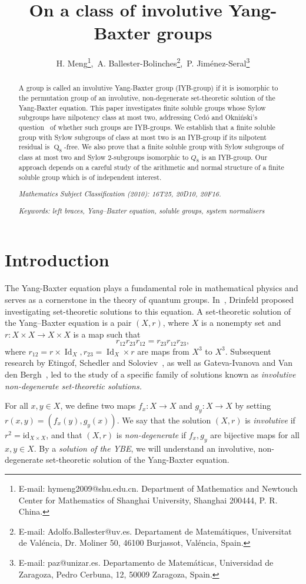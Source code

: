 \documentclass[12pt,a4paper]{article}
\title{On a class of involutive Yang-Baxter groups}
\author{H. Meng\thanks{E-mail: hymeng2009@shu.edu.cn. Department of Mathematics
and Newtouch Center for Mathematics of Shanghai University,
Shanghai 200444, P. R. China. },~A. Ballester-Bolinches\thanks{E-mail: Adolfo.Ballester@uv.es. Departament de Matem\'{a}tiques, Universitat de Val\'{e}ncia, Dr. Moliner 50, 46100 Burjassot, Val\'{e}ncia,
Spain.},~P. Jim\'{e}nez-Seral\thanks{E-mail: paz@unizar.es. Departamento de Matem\'{a}ticas, Universidad de Zaragoza, Pedro Cerbuna, 12, 50009 Zaragoza, Spain.}
}
\date{}
\DeclareMathOperator{\Id}{Id}
\DeclareMathOperator{\Q}{Q}
\theoremstyle{definition}
\begin{document}
\maketitle

\begin{abstract}
A group is called an involutive Yang-Baxter group (IYB-group) if it is isomorphic to the permutation group of an involutive, non-degenerate set-theoretic solution of the Yang-Baxter equation. This paper investigates finite soluble groups whose Sylow subgroups have nilpotency class at most two, addressing Ced\'{o} and Okni\'{n}ski's question~\cite{CedoOkninski2025} of whether such groups are IYB-groups. We establish that a finite soluble group with Sylow subgroups of class at most two is an IYB-group if its nilpotent residual is $\Q_8$-free. We also prove that a finite soluble group with Sylow subgroups of class at most two and Sylow $2$-subgroups isomorphic to $Q_8$ is an IYB-group. Our approach depends on a careful study of the arithmetic and normal structure of a finite soluble group which is of independent interest.

\noindent\emph{Mathematics Subject Classification (2010): 16T25, 20D10, 20F16.}

\noindent\emph{Keywords: left braces, Yang–Baxter
equation, soluble groups, system normalisers}
\end{abstract}

\section{Introduction}
The Yang-Baxter equation plays a fundamental role in mathematical physics and serves as a cornerstone in the theory of quantum groups. In~\cite{Drinfeld1992}, Drinfeld proposed investigating set-theoretic solutions to this equation. A set-theoretic solution of the Yang–Baxter
equation is a pair $(X,r)$, where $X$ is a nonempty set and $r: X\times X \rightarrow X \times X$ is a map such that
$$r_{12}r_{23}r_{12}=r_{23}r_{12}r_{23},$$
where $r_{12}=r\times \Id_X, r_{23}=\Id_X \times r$ are maps from $X^3$ to $X^3$. Subsequent research by Etingof, Schedler and Soloviev~\cite{EtingofSchedlerSoloviev1999}, as well as Gateva-Ivanova and Van den Bergh~\cite{Gateva-IvanovaVandenBergh1998},
led to the study of a specific family of solutions known as \emph{involutive non-degenerate set-theoretic solutions.}

For all \( x, y \in X \), we define two maps \( f_x : X \longrightarrow X \) and \( g_y : X \longrightarrow X \) by setting \( r(x, y) = (f_x(y), g_y(x)) \). We say that the solution \((X, r)\) is \emph{involutive} if \( r^2 = \text{id}_{X \times X} \), and that \((X, r)\) is \emph{non-degenerate} if \( f_x, g_y \) are bijective maps for all \( x, y \in X \). By a \emph{solution of the YBE}, we will understand an involutive, non-degenerate set-theoretic solution of the Yang-Baxter equation.
\end{document}
